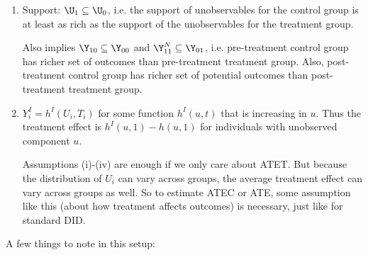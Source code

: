 \documentclass[12pt]{article}
\theoremstyle{plain}
\theoremstyle{definition}
\theoremstyle{remark}
\begin{document}
\begin{enumerate}[label=(\roman*)]
  \item Support: $\U_1\subseteq \U_0$, i.e. the support of
    unobservables for the control group is at least as rich as the
    support of the unobservables for the treatment group.

    Also implies
    $\Y_{10}\subseteq \Y_{00}$ and
    $\Y^N_{11}\subseteq \Y_{01}$,
    i.e. pre-treatment control group has richer set of outcomes than
    pre-treatment treatment group.
    Also, post-treatment control group has richer set of potential
    outcomes than post-treatment treatment group.


  \item $Y_i^I=h^I(U_i,T_i)$ for some function $h^I(u,t)$ that is
    increasing in $u$.
    Thus the treatment effect is $h^I(u,1)-h(u,1)$ for
    individuals with unobserved component $u$.

    Assumptions (i)-(iv) are enough if we only care about ATET.
    But because the distribution of $U_i$ can vary across groups,
    the average treatment effect can vary across groups as well.
    So to estimate ATEC or ATE, some assumption like
    this (about how treatment affects outcomes) is necessary,
    just like for standard DID.
\end{enumerate}
A few things to note in this setup:
\end{document}

